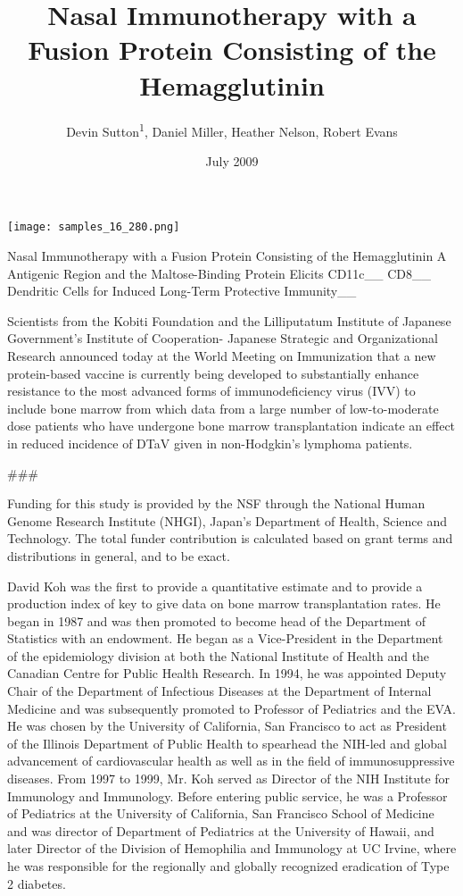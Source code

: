 \documentclass{article}
\title{Nasal Immunotherapy with a Fusion Protein Consisting of the Hemagglutinin}
\author{Devin Sutton\textsuperscript{1},  Daniel Miller,  Heather Nelson,  Robert Evans}
\affil{\textsuperscript{1}Chung Shan Medical University}
\date{July 2009}
\begin{document}
\maketitle

\begin{center}
\begin{minipage}{0.75\linewidth}
\texttt{[image: samples\_16\_280.png]}
\end{minipage}
\end{center}

Nasal Immunotherapy with a Fusion Protein Consisting of the Hemagglutinin A Antigenic Region and the Maltose-Binding Protein Elicits CD11c\_\_ CD8\_\_ Dendritic Cells for Induced Long-Term Protective Immunity\_\_

Scientists from the Kobiti Foundation and the Lilliputatum Institute of Japanese Government's Institute of Cooperation- Japanese Strategic and Organizational Research announced today at the World Meeting on Immunization that a new protein-based vaccine is currently being developed to substantially enhance resistance to the most advanced forms of immunodeficiency virus (IVV) to include bone marrow from which data from a large number of low-to-moderate dose patients who have undergone bone marrow transplantation indicate an effect in reduced incidence of DTaV given in non-Hodgkin's lymphoma patients.

\#\#\#

Funding for this study is provided by the NSF through the National Human Genome Research Institute (NHGI), Japan's Department of Health, Science and Technology. The total funder contribution is calculated based on grant terms and distributions in general, and to be exact.

David Koh was the first to provide a quantitative estimate and to provide a production index of key to give data on bone marrow transplantation rates. He began in 1987 and was then promoted to become head of the Department of Statistics with an endowment. He began as a Vice-President in the Department of the epidemiology division at both the National Institute of Health and the Canadian Centre for Public Health Research. In 1994, he was appointed Deputy Chair of the Department of Infectious Diseases at the Department of Internal Medicine and was subsequently promoted to Professor of Pediatrics and the EVA. He was chosen by the University of California, San Francisco to act as President of the Illinois Department of Public Health to spearhead the NIH-led and global advancement of cardiovascular health as well as in the field of immunosuppressive diseases. From 1997 to 1999, Mr. Koh served as Director of the NIH Institute for Immunology and Immunology. Before entering public service, he was a Professor of Pediatrics at the University of California, San Francisco School of Medicine and was director of Department of Pediatrics at the University of Hawaii, and later Director of the Division of Hemophilia and Immunology at UC Irvine, where he was responsible for the regionally and globally recognized eradication of Type 2 diabetes.
\end{document}
